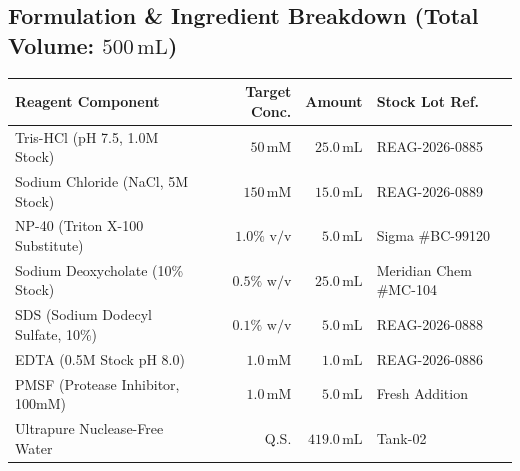 \documentclass[10pt,a4paper]{article}
\begin{document}
\vspace{6pt}

\begin{tcolorbox}[labcardnavy, title={\small\bfseries\color{white}\faFlask\ SECTION 3: SPECIALIZED FORMULATION SHEET -- BATCH \# REAG-2026-0892 (RIPA LYSIS BUFFER)}, coltitle=white, colbacktitle=labnavy]

  \begin{minipage}[t]{0.62\textwidth}
    {\subsection*{{\small\bfseries\color{labnavy} Formulation \& Ingredient Breakdown (Total Volume: $500\,\text{mL}$)}}}
    \vspace{-4pt}
    \scriptsize
    \begin{tabularx}{\textwidth}{@{}Xrr>{\raggedright\arraybackslash}X@{}}
      \toprule
      \rowcolor{labbg}
      \textbf{Reagent Component} & \textbf{Target Conc.} & \textbf{Amount} & \textbf{Stock Lot Ref.} \\
      \midrule
      Tris-HCl (pH 7.5, 1.0M Stock) & $50\,\text{mM}$ & $25.0\,\text{mL}$ & REAG-2026-0885 \\
      Sodium Chloride (NaCl, 5M Stock) & $150\,\text{mM}$ & $15.0\,\text{mL}$ & REAG-2026-0889 \\
      NP-40 (Triton X-100 Substitute) & $1.0\% \text{ v/v}$ & $5.0\,\text{mL}$ & Sigma \#BC-99120 \\
      Sodium Deoxycholate (10\% Stock) & $0.5\% \text{ w/v}$ & $25.0\,\text{mL}$ & Meridian Chem \#MC-104 \\
      SDS (Sodium Dodecyl Sulfate, 10\%) & $0.1\% \text{ w/v}$ & $5.0\,\text{mL}$ & REAG-2026-0888 \\
      EDTA (0.5M Stock pH 8.0) & $1.0\,\text{mM}$ & $1.0\,\text{mL}$ & REAG-2026-0886 \\
      PMSF (Protease Inhibitor, 100mM) & $1.0\,\text{mM}$ & $5.0\,\text{mL}$ & Fresh Addition \\
      Ultrapure Nuclease-Free Water & Q.S. & $419.0\,\text{mL}$ & Tank-02 \\
      \bottomrule
    \end{tabularx}
  \end{minipage}%
  \hfill
  \begin{minipage}[t]{0.35\textwidth}
    \begin{tcolorbox}[labcard, colback=labred!5!white, colframe=labred]

\end{tcolorbox}
\end{minipage}
\end{tcolorbox}
\end{document}
